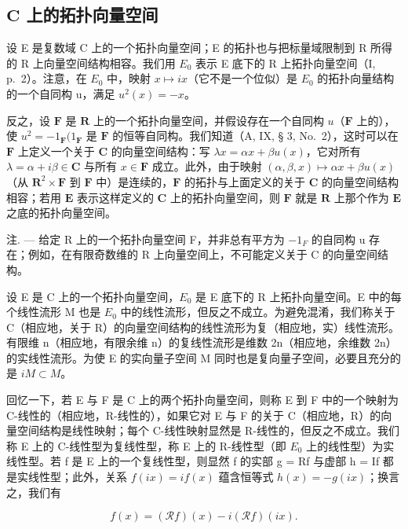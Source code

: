 \subsection{\texorpdfstring{\(\mathbf{C}\) 上的拓扑向量空间}{复数域上的拓扑向量空间}}

设 E 是复数域 C 上的一个拓扑向量空间；E 的拓扑也与把标量域限制到 R 所得的 R 上向量空间结构相容。我们用 \(E_{0}\) 表示 E 底下的 R 上拓扑向量空间（I, p.~2）。注意，在 \(E_{0}\) 中，映射 \(x \mapsto ix\)（它不是一个位似）是 \(E_{0}\) 的拓扑向量结构的一个自同构 u，满足 \(u^{2}(x) = -x\)。

反之，设 \(\mathbf{F}\) 是 \(\mathbf{R}\) 上的一个拓扑向量空间，并假设存在一个自同构 \(u\)（\(\mathbf{F}\) 上的），使 \(u^2 = -1_{\mathbf{F}}(1_{\mathbf{F}}\) 是 \(\mathbf{F}\) 的恒等自同构。我们知道（A, IX, § 3, No.~2），这时可以在 \(\mathbf{F}\) 上定义一个关于 \(\mathbf{C}\) 的向量空间结构：写 \(\lambda x = \alpha x + \beta u(x)\)，它对所有 \(\lambda = \alpha + i\beta \in \mathbf{C}\) 与所有 \(x \in \mathbf{F}\) 成立。此外，由于映射 \((\alpha, \beta, x) \mapsto \alpha x + \beta u(x)\)（从 \(\mathbf{R}^2 \times \mathbf{F}\) 到 \(\mathbf{F}\) 中）是连续的，\(\mathbf{F}\) 的拓扑与上面定义的关于 \(\mathbf{C}\) 的向量空间结构相容；若用 \(\mathbf{E}\) 表示这样定义的 \(\mathbf{C}\) 上的拓扑向量空间，则 \(\mathbf{F}\) 就是 \(\mathbf{R}\) 上那个作为 \(\mathbf{E}\) 之底的拓扑向量空间。

注. --- 给定 R 上的一个拓扑向量空间 F，并非总有平方为 \(-1_{F}\) 的自同构 u 存在；例如，在有限奇数维的 R 上向量空间上，不可能定义关于 C 的向量空间结构。

设 E 是 C 上的一个拓扑向量空间，\(E_{0}\) 是 E 底下的 R 上拓扑向量空间。E 中的每个线性流形 M 也是 \(E_{0}\) 中的线性流形，但反之不成立。为避免混淆，我们称关于 C（相应地，关于 R）的向量空间结构的线性流形为复（相应地，实）线性流形。有限维 n（相应地，有限余维 n）的复线性流形是维数 2n（相应地，余维数 2n）的实线性流形。为使 E 的实向量子空间 M 同时也是复向量子空间，必要且充分的是 \(iM \subset M\)。

回忆一下，若 E 与 F 是 C 上的两个拓扑向量空间，则称 E 到 F 中的一个映射为 C-线性的（相应地，R-线性的），如果它对 E 与 F 的关于 C（相应地，R）的向量空间结构是线性映射；每个 C-线性映射显然是 R-线性的，但反之不成立。我们称 E 上的 C-线性型为复线性型，称 E 上的 R-线性型（即 \(E_{0}\) 上的线性型）为实线性型。若 f 是 E 上的一个复线性型，则显然 f 的实部 g = Rf 与虚部 h = If 都是实线性型；此外，关系 \(f(ix) = if(x)\) 蕴含恒等式 \(h(x) = -g(ix)\)；换言之，我们有

\[
f (x) = (\mathscr {R} f) (x) - i (\mathscr {R} f) (i x).\tag{1}
\]

